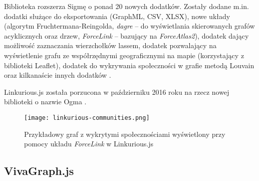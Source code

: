 Biblioteka rozszerza Sigmę o ponad 20 nowych dodatków. Zostały dodane m.in. dodatki służące do eksportowania (GraphML, CSV, XLSX), nowe układy (algorytm Fruchtermana-Reingolda, \textit{dagre} -- do wyświetlania skierowanych grafów acyklicznych oraz drzew, \textit{ForceLink} -- bazujący na \textit{ForceAtlas2}), dodatek dający możliwość zaznaczania wierzchołków lassem, dodatek pozwalający na wyświetlenie grafu ze współrzędnymi geograficznymi na mapie (korzystający z biblioteki Leaflet), dodatek do wykrywania społeczności w grafie metodą Louvain oraz kilkanaście innych dodatków \cite{linkurious-diff}. 

Linkurious.js została porzucona w październiku 2016 roku na rzecz nowej biblioteki o nazwie Ogma \cite{ogma}.

\bigskip

\begin{figure}[H]
\centering
\texttt{[image: linkurious-communities.png]}
\captionsetup{justification=centering}
\caption{Przykładowy graf z wykrytymi społecznościami wyświetlony przy pomocy układu \textit{ForceLink} w Linkurious.js}\label{fig:cytoscape}
\end{figure}

\bigskip

\subsection{VivaGraph.js}



